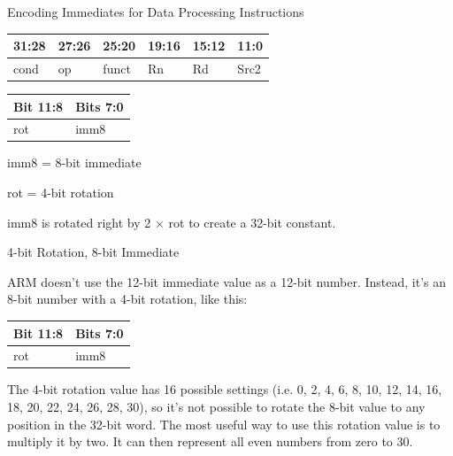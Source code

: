 \documentclass[aspectratio=169]{beamer}
\begin{document}
\begin{frame}{Encoding Immediates for Data Processing Instructions}
    \begin{center}
        \begin{tabular}{|p{4em}|p{4em}|p{4em}|p{4em}|p{4em}|p{4em}|}
        \hline
        31:28 & 27:26 & 25:20 & 19:16 & 15:12 & 11:0 \\
        \hline
        cond & op & funct & Rn & Rd & Src2 \\
        \hline
        \end{tabular}

        \vspace{0.5cm}


        \begin{tabular}{|p{11em}|p{11em}|}
            \hline
            Bit 11:8 & Bits 7:0\\
            \hline
            rot & imm8 \\
            \hline
        \end{tabular}

        \vspace{0.5cm}

        imm8 = 8-bit immediate

        rot = 4-bit rotation

        imm8 is rotated right by 2 $\times$ rot to create a 32-bit constant.


    \end{center}

\end{frame}


\begin{frame}{4-bit Rotation, 8-bit Immediate}

    ARM doesn't use the 12-bit immediate value as a 12-bit number. Instead, it's an 8-bit number with a 4-bit rotation, like this:


    \vspace{0.5cm}

    \begin{tabular}{|p{11em}|p{11em}|}
        \hline
        Bit 11:8 & Bits 7:0\\
        \hline
        rot & imm8 \\
        \hline
    \end{tabular}


    \vspace{0.5cm}

    The 4-bit rotation value has 16 possible settings (i.e. 0, 2, 4, 6, 8, 10, 12, 14, 16, 18, 20, 22, 24, 26, 28, 30), so it's not possible to rotate the 8-bit value to any position in the 32-bit word. The most useful way to use this rotation value is to multiply it by two. It can then represent all even numbers from zero to 30.
    
\end{frame}
\end{document}
